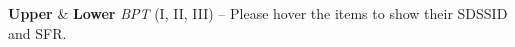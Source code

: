 \textbf{\label{fig:1}} \textbf{Upper} & \textbf{Lower} \textit{BPT} (I, II, III) – Please hover the items to show their SDSSID and SFR.